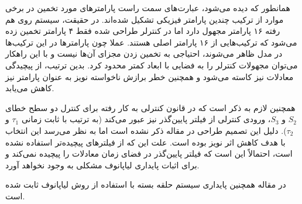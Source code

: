 
همانطور که دیده می‌شود، عبارت‌های سمت راست پارامترهای مورد تخمین در برخی موارد از ترکیب چندین پارامتر فیزیکی تشکیل شده‌اند.
در حقیقت، سیستم روی هم رفته ۱۶ پارامتر مجهول دارد اما در کنترلر طراحی شده فقط ۴ پارامتر تخمین زده می‌شود که ترکیب‌هایی از ۱۶ پارامتر اصلی هستند.
عملا چون پارامترها در این ترکیب‌ها در مدل ظاهر می‌شوند، احتیاجی به تخمین زدن مجزای آن‌ها نیست و با این راهکار می‌توان مجهولات کنترلر را به فضایی با ابعاد کمتر محدود کرد.
بدین ترتیب، از پیچیدگی معادلات نیز کاسته می‌شود و همچنین خطر برازش ناخواسته نویز به عنوان پارامتر نیز کاهش می‌یابد.

همچنین لازم به ذکر است که در قانون کنترلی به کار رفته برای کنترل دو سطح خطای $S_2$ و $S_3$، ورودی کنترلی از فیلتر پایین‌گذر نیز عبور می‌کند (به ترتیب با ثابت زمانی $\tau_1$ و $\tau_2$).
دلیل این تصمیم طراحی در مقاله ذکر نشده است اما به نظر می‌رسد این انتخاب با هدف کاهش اثر نویز بوده است.
علت این که از فیلترهای پیچیده‌تر استفاده نشده است، احتمالاً این است که فیلتر پایین‌گذر در فضای زمان معادلات را پیچیده نمی‌کند و برای اثبات پایداری لیاپانوف مشکلی به وجود نخواهد آورد.

در‌ مقاله همچنین پایداری سیستم حلقه بسته با استفاده از روش لیاپانوف ثابت شده است.
